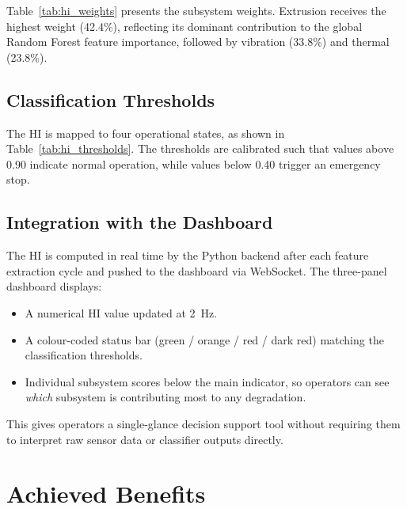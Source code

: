 Table~\ref{tab:hi_weights} presents the subsystem weights. Extrusion receives the highest
weight (42.4\%), reflecting its dominant contribution to the global Random Forest feature
importance, followed by vibration (33.8\%) and thermal (23.8\%).

\begin{table}[H]
\centering
\caption{Health Index -- subsystem weights derived from feature importance}
\label{tab:hi_weights}

\end{table}

\subsection{Classification Thresholds}

The HI is mapped to four operational states, as shown in Table~\ref{tab:hi_thresholds}.
The thresholds are calibrated such that values above 0.90 indicate normal operation,
while values below 0.40 trigger an emergency stop.

\begin{table}[H]
\centering
\caption{Health Index operational states}
\label{tab:hi_thresholds}

\end{table}

\subsection{Integration with the Dashboard}

The HI is computed in real time by the Python backend after each feature extraction cycle
and pushed to the dashboard via WebSocket. The three-panel dashboard displays:
\begin{itemize}
    \item A numerical HI value updated at 2~Hz.
    \item A colour-coded status bar (green / orange / red / dark red) matching the
          classification thresholds.
    \item Individual subsystem scores below the main indicator, so operators can see
          \emph{which} subsystem is contributing most to any degradation.
\end{itemize}
This gives operators a single-glance decision support tool without requiring them to
interpret raw sensor data or classifier outputs directly.

\section{Achieved Benefits}
\label{sec:benefits}

